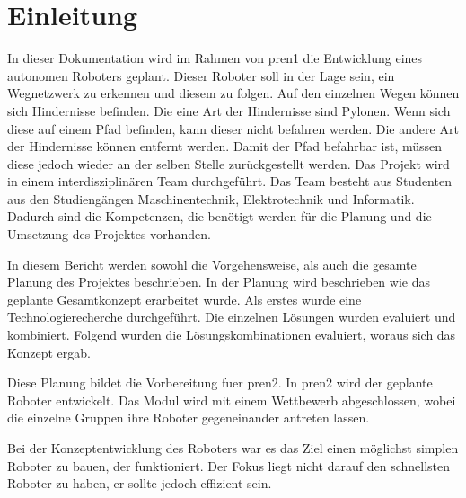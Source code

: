 \section{Einleitung}

In dieser Dokumentation wird im Rahmen von \acrfull{pren1} die Entwicklung eines autonomen Roboters geplant. Dieser Roboter soll in der Lage sein, ein Wegnetzwerk zu erkennen und diesem zu folgen. Auf den einzelnen Wegen können sich Hindernisse befinden. Die eine Art der Hindernisse sind Pylonen. Wenn sich diese auf einem Pfad befinden, kann dieser nicht befahren werden. Die andere Art der Hindernisse können entfernt werden. Damit der Pfad befahrbar ist, müssen diese jedoch wieder an der selben Stelle zurückgestellt werden.
Das Projekt wird in einem interdisziplinären Team durchgeführt. Das Team besteht aus Studenten aus den Studiengängen Maschinentechnik, Elektrotechnik und Informatik. Dadurch sind die Kompetenzen, die benötigt werden für die Planung und die Umsetzung des Projektes vorhanden.

In diesem Bericht werden sowohl die Vorgehensweise, als auch die gesamte Planung des Projektes beschrieben. In der Planung wird beschrieben wie das geplante Gesamtkonzept erarbeitet wurde. Als erstes wurde eine Technologierecherche durchgeführt. Die einzelnen Lösungen wurden evaluiert und kombiniert. Folgend wurden die Lösungskombinationen evaluiert, woraus sich das Konzept ergab.

Diese Planung bildet die Vorbereitung fuer \acrfull{pren2}. In \acrshort{pren2} wird der geplante Roboter entwickelt. Das Modul wird mit einem Wettbewerb abgeschlossen, wobei die einzelne Gruppen ihre Roboter gegeneinander antreten lassen.

Bei der Konzeptentwicklung des Roboters war es das Ziel einen möglichst simplen Roboter zu bauen, der funktioniert. Der Fokus liegt nicht darauf den schnellsten Roboter zu haben, er sollte jedoch effizient sein.